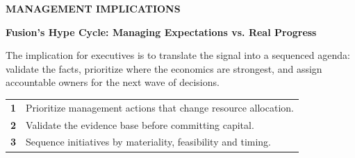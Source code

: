 \documentclass[10pt,a4paper]{article}
\begin{document}
\clearpage
{\textcolor{BOBlue}{\scriptsize\bfseries MANAGEMENT IMPLICATIONS}}\par\vspace{-1pt}
{\Large\sffamily\bfseries\color{BONavy} Fusion's Hype Cycle: Managing Expectations vs. Real Progress}\par\vspace{4pt}
{\small The implication for executives is to translate the signal into a sequenced agenda: validate the facts, prioritize where the economics are strongest, and assign accountable owners for the next wave of decisions.}\par
\begin{tabularx}{\linewidth}{p{10mm}Y}
\textcolor{BOBlue}{\bfseries 1} & Prioritize management actions that change resource allocation. \\[5pt]
\textcolor{BOBlue}{\bfseries 2} & Validate the evidence base before committing capital. \\[5pt]
\textcolor{BOBlue}{\bfseries 3} & Sequence initiatives by materiality, feasibility and timing. \\[5pt]
\end{tabularx}
\vspace{6pt}

\vspace{6pt}{\textcolor{BOBlue}{\scriptsize\bfseries EXECUTION ROADMAP}}\par
\begin{center}
\end{center}
\end{document}
